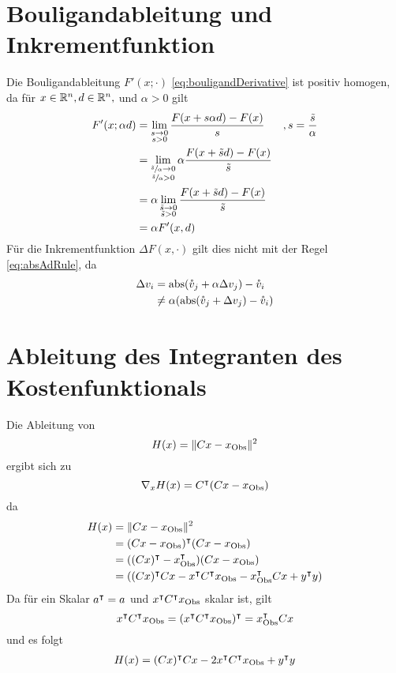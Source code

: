 \section{Bouligandableitung und Inkrementfunktion}\label{sec:bouligandAndIncrement}
 Die Bouligandableitung $F'(x;\cdot)$ \eqref{eq:bouligandDerivative} ist positiv homogen, da für $x\in \mathbb{R}^n, d\in \mathbb{R}^n,$ und $\alpha>0$ gilt
 \[
 \begin{aligned}
  F'(x;\alpha d) &=  \lim_{\substack{s\to 0 \\ s>0}} \frac{F(x+s\alpha d)-F(x)}{s} &,s = \frac{\tilde s}{\alpha} \\
			 &=  \lim_{\substack{\sfrac{\tilde s}{\alpha}\to 0 \\ \sfrac{\tilde s}{\alpha}>0}} \alpha \frac{F(x+\tilde s d)-F(x)}{\tilde s} \\
			 &= \alpha \lim_{\substack{\tilde s\to 0 \\ \tilde s>0}} \frac{F(x+\tilde s d)-F(x)}{\tilde s} \\
			 &= \alpha  F'(x, d) 
 \end{aligned}
 \]
Für die Inkrementfunktion $\Delta F(x,\cdot)$ gilt dies nicht mit der Regel \ref{eq:absAdRule}, da 
\[
\begin{aligned}
 \Delta v_i &= \operatorname{abs}(\mathring{v}_j+ \alpha \Delta v_j) - \mathring{v}_i \\
 &\neq \alpha (\operatorname{abs}(\mathring{v}_j+ \Delta v_j) - \mathring{v}_i) \\
 \end{aligned}
\]
\section{Ableitung des Integranten des Kostenfunktionals}\label{sec:adjIntegrandCostfunctional}
Die Ableitung von 
\[
H(x) = \|Cx -x_{\text{Obs}}\|^2
\]
ergibt sich zu
\[
 \nabla_x H(x) = C^\intercal(Cx -x_{\text{Obs}})
\]
da 
\[
\begin{aligned}
H(x) &= \|Cx -x_{\text{Obs}}\|^2\\
     &= (Cx -x_{\text{Obs}})^\intercal(Cx -x_{\text{Obs}})\\
     &= ((Cx)^\intercal -x_{\text{Obs}}^\intercal)(Cx -x_{\text{Obs}})\\
     &= ((Cx)^\intercal Cx -x^\intercal C^\intercal x_{\text{Obs}} - x_{\text{Obs}}^\intercal Cx + y^\intercal y)\\
\end{aligned}
\]
Da für ein Skalar $a^\intercal = a$ und $x^\intercal C^\intercal x_{\text{Obs}}$ skalar ist, gilt 
\[
 x^\intercal C^\intercal x_{\text{Obs}} =(x^\intercal C^\intercal x_{\text{Obs}})^\intercal =  x_{\text{Obs}}^\intercal Cx
\]
und es folgt
\[
\begin{aligned}
H(x) &= (Cx)^\intercal Cx -2 x^\intercal C^\intercal x_{\text{Obs}} + y^\intercal y\\
\end{aligned}
\]

